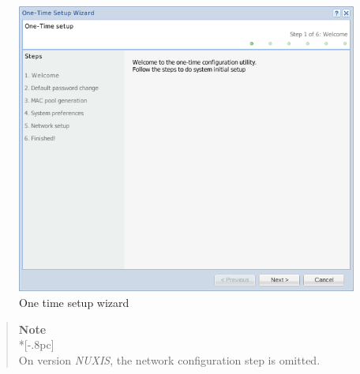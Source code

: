 \begin{figure}[H]
        \begin{center}
        \includegraphics[scale=0.7]{screenshots/first_time_wizard.png}
        \caption{One time setup wizard}
        \label{fig:first_time_wizard}
        \end{center}
\end{figure}

\begin{quote}
	{\large \bf Note} \\*[-.8pc]
	\underline{\hspace{6in}} \\
	On version \emph{NUXIS}, the network configuration step is omitted.
\end{quote}

